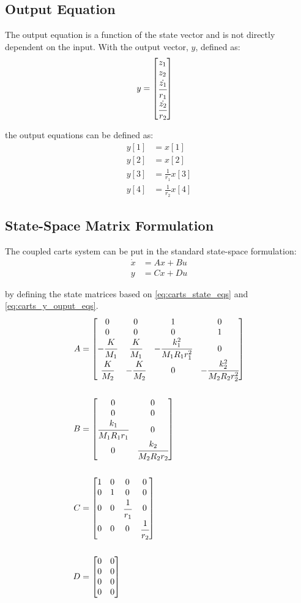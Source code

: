 \documentclass[]{article}
\begin{document}
	\subsection{Output Equation}
		The output equation is a function of the state vector and is not directly dependent on the input. With the output vector, $y$, defined as:
		\begin{align}
			y &= \mqty[z_1\\ z_2\\ \cfrac{\dot{z_1}}{r_1}\\ \cfrac{\dot{z_2}}{r_2}]\label{eq:carts_y_def}
		\end{align}
		
		the output equations can be defined as:
		\begin{equation}\label{eq:carts_y_ouput_eqs}
			\begin{aligned}
				y[1] &= x[1]\\
				y[2] &= x[2]\\
				y[3] &= \frac{1}{r_1} x[3]\\
				y[4] &= \frac{1}{r_2} x[4]
			\end{aligned}
		\end{equation}
	
	\subsection{State-Space Matrix Formulation}
		The coupled carts system can be put in the standard state-space formulation:
		\begin{equation}\label{eq:state_space_eqs_def}
			\begin{aligned}
				\dot{x} &= A x + B u\\
				y &= C x + D u
			\end{aligned}
		\end{equation}
		 
		 by defining the state matrices based on \eqref{eq:carts_state_eqs} and \eqref{eq:carts_y_ouput_eqs}.
		\begin{align}
			A &= \mqty[	0	& 0			& 1					& 0\\
						0	& 0	 		& 0					& 1\\
						-\cfrac{K}{M_1}	& \cfrac{K}{M_1}	& -\cfrac{k_1^2}{M_1 R_1 r_1^2}	& 0\\
						\cfrac{K}{M_2}	& -\cfrac{K}{M_2}	& 0								& -\cfrac{k_2^2}{M_2 R_2 r_2^2}
						]\label{eq:carts_A_matrix}\\
			\nonumber\\
			B &= \mqty[ 0						& 0\\
						0						& 0\\
						\cfrac{k_1}{M_1 R_1 r_1}	& 0\\
						0						& \cfrac{k_2}{M_2 R_2 r_2}
						]\label{eq:carts_B_matrix}\\
			\nonumber\\
			C &= \mqty[\dmat[0]{1,1,\cfrac{1}{r_1},\cfrac{1}{r_2}}]\label{eq:carts_C_matrix}\\
			\nonumber\\
			D &= \mqty[\zmat{4}{2}]\label{eq:carts_D_matrix}
		\end{align}
		
				
		
\end{document}
